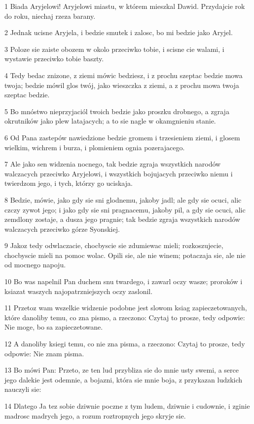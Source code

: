 \par 1 Biada Aryjelowi! Aryjelowi miastu, w którem mieszkal Dawid. Przydajcie rok do roku, niechaj rzeza barany.
\par 2 Jednak ucisne Aryjela, i bedzie smutek i zalosc, bo mi bedzie jako Aryjel.
\par 3 Poloze sie zaiste obozem w okolo przeciwko tobie, i scisne cie walami, i wystawie przeciwko tobie baszty.
\par 4 Tedy bedac znizone, z ziemi mówic bedziesz, i z prochu szeptac bedzie mowa twoja; bedzie mówil glos twój, jako wieszczka z ziemi, a z prochu mowa twoja szeptac bedzie.
\par 5 Bo mnóstwo nieprzyjaciól twoich bedzie jako proszku drobnego, a zgraja okrutników jako plew latajacych; a to sie nagle w okamgnieniu stanie.
\par 6 Od Pana zastepów nawiedzione bedzie gromem i trzesieniem ziemi, i glosem wielkim, wichrem i burza, i plomieniem ognia pozerajacego.
\par 7 Ale jako sen widzenia nocnego, tak bedzie zgraja wszystkich narodów walczacych przeciwko Aryjelowi, i wszystkich bojujacych przeciwko niemu i twierdzom jego, i tych, którzy go uciskaja.
\par 8 Bedzie, mówie, jako gdy sie sni glodnemu, jakoby jadl; ale gdy sie ocuci, alic czczy zywot jego; i jako gdy sie sni pragnacemu, jakoby pil, a gdy sie ocuci, alic zemdlony zostaje, a dusza jego pragnie; tak bedzie zgraja wszystkich narodów walczacych przeciwko górze Syonskiej.
\par 9 Jakoz tedy odwlaczacie, chocbyscie sie zdumiewac mieli; rozkoszujecie, chocbyscie mieli na pomoc wolac. Opili sie, ale nie winem; potaczaja sie, ale nie od mocnego napoju.
\par 10 Bo was napelnil Pan duchem snu twardego, i zawarl oczy wasze; proroków i ksiazat waszych najopatrzniejszych oczy zaslonil.
\par 11 Przetoz wam wszelkie widzenie podobne jest slowom ksiag zapieczetowanych, które danoliby temu, co zna pismo, a rzeczono: Czytaj to prosze, tedy odpowie: Nie moge, bo sa zapieczetowane.
\par 12 A danoliby ksiegi temu, co nie zna pisma, a rzeczono: Czytaj to prosze, tedy odpowie: Nie znam pisma.
\par 13 Bo mówi Pan: Przeto, ze ten lud przybliza sie do mnie usty swemi, a serce jego dalekie jest odemnie, a bojazni, która sie mnie boja, z przykazan ludzkich nauczyli sie:
\par 14 Dlatego Ja tez sobie dziwnie poczne z tym ludem, dziwnie i cudownie, i zginie madrosc madrych jego, a rozum roztropnych jego skryje sie.
